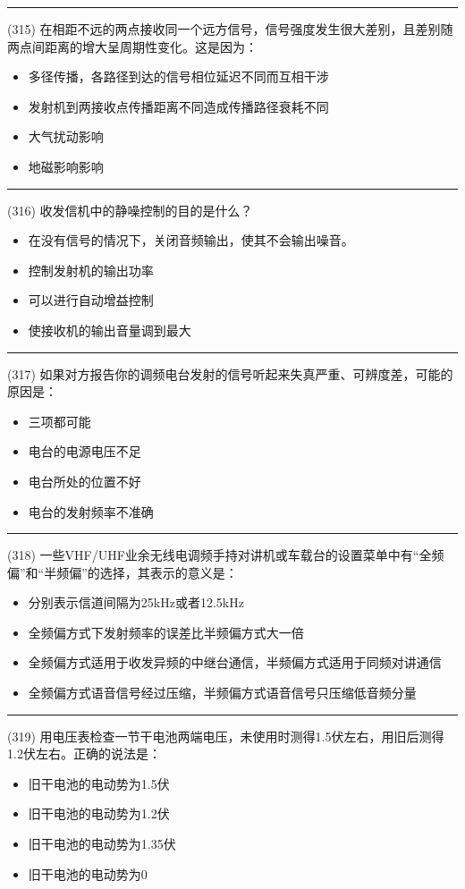 \documentclass[twocolumn]{ctexart}  %
\begin{document}
\noindent\rule{0.5\textwidth}{1pt}
\heiti (315) 在相距不远的两点接收同一个远方信号，信号强度发生很大差别，且差别随两点间距离的增大呈周期性变化。这是因为： \songti {\color{gray} [LK1065] }
\begin{itemize}
	\item  多径传播，各路径到达的信号相位延迟不同而互相干涉
	\item  发射机到两接收点传播距离不同造成传播路径衰耗不同
	\item  大气扰动影响
	\item  地磁影响影响
\end{itemize}


\noindent\rule{0.5\textwidth}{1pt}
\heiti (316) 收发信机中的静噪控制的目的是什么？ \songti {\color{gray} [LK1130] }
\begin{itemize}
	\item  在没有信号的情况下，关闭音频输出，使其不会输出噪音。
	\item  控制发射机的输出功率
	\item  可以进行自动增益控制
	\item  使接收机的输出音量调到最大
\end{itemize}


\noindent\rule{0.5\textwidth}{1pt}
\heiti (317) 如果对方报告你的调频电台发射的信号听起来失真严重、可辨度差，可能的原因是： \songti {\color{gray} [LK1182] }
\begin{itemize}
	\item  三项都可能
	\item  电台的电源电压不足
	\item  电台所处的位置不好
	\item  电台的发射频率不准确
\end{itemize}


\noindent\rule{0.5\textwidth}{1pt}
\heiti (318) 一些VHF/UHF业余无线电调频手持对讲机或车载台的设置菜单中有“全频偏”和“半频偏”的选择，其表示的意义是： \songti {\color{gray} [LK1237] }
\begin{itemize}
	\item  分别表示信道间隔为25kHz或者12.5kHz
	\item  全频偏方式下发射频率的误差比半频偏方式大一倍
	\item  全频偏方式适用于收发异频的中继台通信，半频偏方式适用于同频对讲通信
	\item  全频偏方式语音信号经过压缩，半频偏方式语音信号只压缩低音频分量
\end{itemize}


\noindent\rule{0.5\textwidth}{1pt}
\heiti (319) 用电压表检查一节干电池两端电压，未使用时测得1.5伏左右，用旧后测得1.2伏左右。正确的说法是： \songti {\color{gray} [LK0436] }
\begin{itemize}
	\item  旧干电池的电动势为1.5伏
	\item  旧干电池的电动势为1.2伏
	\item  旧干电池的电动势为1.35伏
	\item  旧干电池的电动势为0
\end{itemize}
\end{document}

